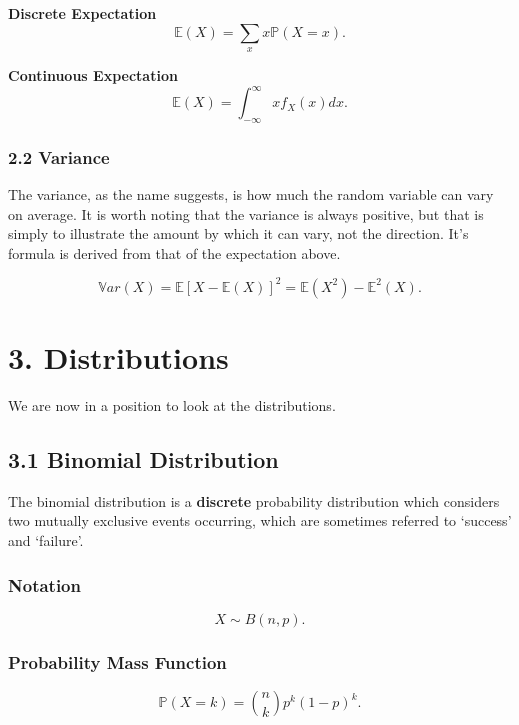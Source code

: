 \documentclass[11pt]{article}
\begin{document}
\textbf{Discrete Expectation}
\begin{equation}
    \mathbb{E}(X) = \sum_x x \mathbb{P}(X = x) .
\end{equation}

\textbf{Continuous Expectation}
\begin{equation}
    \mathbb{E}(X) = \int_{-\infty}^{\infty} x f_X (x) dx.
\end{equation}

\newpage

\subsubsection*{2.2 Variance}
The variance, as the name suggests, is how much the random variable can vary on average. It is worth noting that the variance is always positive, but that is simply to illustrate the amount by which it can vary, not the direction. It's formula is derived from that of the expectation above.

\begin{equation}
    \mathbb{V}ar(X) = \mathbb{E}\left[ X - \mathbb{E}(X) \right]^2 = \mathbb{E}(X^2) - \mathbb{E}^2(X).
\end{equation}

\section*{3. Distributions}
We are now in a position to look at the distributions.

\subsection*{3.1 Binomial Distribution}
The binomial distribution is a \textbf{discrete} probability distribution which considers two mutually exclusive events occurring, which are sometimes referred to `success' and `failure'. 

\subsubsection*{Notation}
\begin{equation}
    X \sim B(n,p).
\end{equation}

\subsubsection*{Probability Mass Function}
\begin{equation}
    \mathbb{P}(X = k) = \binom{n}{k} p^k (1-p)^k.
\end{equation}
\end{document}
